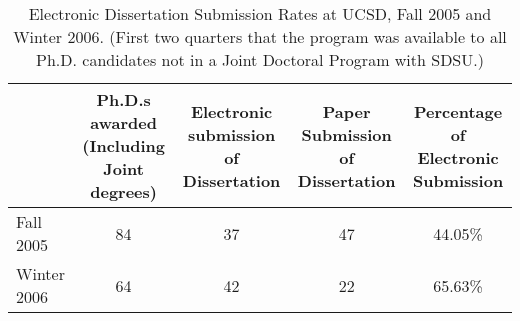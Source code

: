 \documentclass[12pt]{ucsddissertation}
\begin{document}
\begin{table}
\centering
\caption[Electronic Dissertation Submission Rates]{Electronic
Dissertation Submission Rates at UCSD, Fall 2005 and Winter 2006.
(First two quarters that the program was available to all Ph.D.
candidates not in a Joint Doctoral Program with SDSU.)}
\label{tab:good}
\renewcommand\tabularxcolumn[1]{>{\RaggedRight\arraybackslash}p{#1}}
\begin{tabularx}{.9\linewidth}{lcccc}
\toprule
&\multicolumn{1}{X}{Ph.D.s awarded (Including Joint degrees)}
&\multicolumn{1}{X}{Electronic submission of Dissertation}
&\multicolumn{1}{X}{Paper Submission of Dissertation}
&\multicolumn{1}{X}{Percentage of Electronic Submission}\\
\midrule
Fall 2005 & 84 & 37 & 47 & 44.05\%\\
Winter 2006 & 64 & 42 & 22 & 65.63\%\\
\bottomrule
\end{tabularx}
\end{table}
\end{document}
